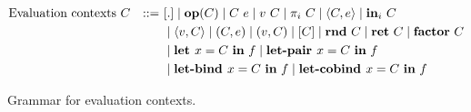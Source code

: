 \begin{figure}[p]
  \begin{alignat*}{2}
         &\text{Evaluation contexts } C &::=~ &[.] 
         \mid \mathbf{op}(C) 
         \mid C~e 
         \mid v~C 
         \mid \pi_i~C 
         \mid \langle C, e \rangle
         \mid \mathbf{in}_i~C \\
         & & &
         \mid \langle v, C \rangle
         \mid (C, e)
         \mid (v, C)
         \mid [ C ]
         \mid \mathbf{rnd}~C 
         \mid \mathbf{ret}~C 
         \mid \mathbf{factor}~C \\ 
         & & &
         \mid \textbf{let } x = C \ \textbf{in} \ f
         \mid \textbf{let-pair } x = C \ \textbf{in} \ f \\
         & & &
         \mid \textbf{let-bind } x = C \ \textbf{in} \ f
         \mid \textbf{let-cobind } x = C \ \textbf{in} \ f \\
  \end{alignat*}
  \caption{Grammar for evaluation contexts.}
  \label{fig:eval-contexts}
\end{figure}

